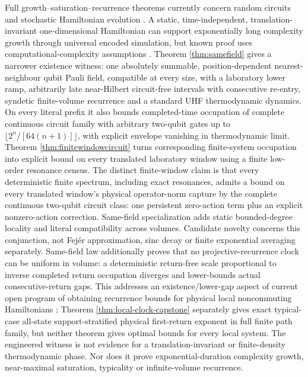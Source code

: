 Full growth--saturation--recurrence theorems currently concern random circuits
and stochastic Hamiltonian evolution \cite{OszmaniecEtAl2024}.  A static,
time-independent, translation-invariant one-dimensional Hamiltonian can
support exponentially long complexity growth through universal encoded
simulation, but known proof uses computational-complexity assumptions
\cite{BohdanowiczBrandao2017}.  Theorem \ref{thm:samefield} gives a narrower
existence witness: one absolutely summable, position-dependent
nearest-neighbour qubit Pauli field, compatible at every size, with a laboratory lower ramp,
arbitrarily late near-Hilbert circuit-free intervals with consecutive
re-entry, syndetic finite-volume recurrence and a standard UHF thermodynamic
dynamics.  On every literal prefix it also bounds completed-time occupation
of complete continuous circuit family with arbitrary two-qubit gates up to
$\lfloor2^n/[64(n+1)]\rfloor$, with explicit envelope vanishing in
thermodynamic limit.  Theorem \ref{thm:finitewindowcircuit} turns corresponding
finite-system occupation into explicit bound on every translated laboratory
window using a finite low-order resonance census.  The distinct finite-window
claim is that every deterministic finite spectrum, including exact
resonances, admits a bound on every translated window's physical
operator-norm capture by the complete continuous two-qubit circuit class:
one persistent zero-action term plus an explicit nonzero-action correction.
Same-field specialization adds static bounded-degree locality and literal
compatibility across volumes.  Candidate novelty concerns this conjunction,
not Fej\'er approximation, sinc decay or finite exponential averaging
separately.  Same-field law
additionally proves that no projective-recurrence clock can be uniform in
volume: a deterministic return-free scale proportional to inverse completed
return occupation diverges and lower-bounds actual consecutive-return gaps.  This
addresses an existence/lower-gap aspect of current open program of obtaining
recurrence bounds for physical local noncommuting Hamiltonians
\cite{KotowskiOszmaniec2026}; Theorem \ref{thm:local-clock-capstone}
separately gives exact typical-case all-state support-stratified physical
first-return exponent in full finite path family, but neither theorem gives
optimal bounds for every local system.  The engineered witness is not evidence
for a translation-invariant or finite-density thermodynamic phase.  Nor does
it prove exponential-duration complexity growth, near-maximal saturation,
typicality or infinite-volume recurrence.

